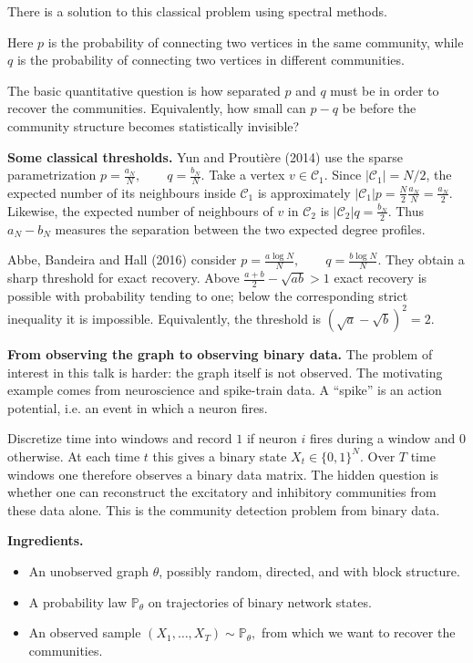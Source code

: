 There is a solution to this classical
problem using spectral methods.

Here $p$ is the probability of connecting
two vertices in the same community, while
$q$ is the probability of connecting two
vertices in different communities.

The basic quantitative question is how
separated $p$ and $q$ must be in order to
recover the communities. Equivalently, how
small can $p-q$ be before the community
structure becomes statistically invisible?

\medskip\noindent
{\bf Some classical thresholds.}
Yun and Prouti\`ere (2014) use the sparse
parametrization
$
p=\frac{a_N}{N},
\qquad
q=\frac{b_N}{N}.
$
Take a vertex $v\in\mathcal{C}_1$.
Since $|\mathcal{C}_1|=N/2$, the expected
number of its neighbours inside
$\mathcal{C}_1$ is approximately
$
|\mathcal{C}_1|p
=\frac{N}{2}\frac{a_N}{N}
=\frac{a_N}{2}.
$
Likewise, the expected number of
neighbours of $v$ in $\mathcal{C}_2$ is
$
|\mathcal{C}_2|q=\frac{b_N}{2}.
$
Thus $a_N-b_N$ measures the separation
between the two expected degree profiles.

Abbe, Bandeira and Hall (2016) consider
$
p=\frac{a\log N}{N},
\qquad
q=\frac{b\log N}{N}.
$
They obtain a sharp threshold for exact
recovery. Above
$
\frac{a+b}{2}-\sqrt{ab}>1
$
exact recovery is possible with
probability tending to one; below the
corresponding strict inequality it is
impossible. Equivalently, the threshold is
$
(\sqrt a-\sqrt b)^2=2.
$

\medskip\noindent
{\bf From observing the graph to observing
binary data.}
The problem of interest in this talk is
harder: the graph itself is not observed.
The motivating example comes from
neuroscience and spike-train data. A
``spike'' is an action potential, i.e. an
event in which a neuron fires.

Discretize time into windows and record
$1$ if neuron $i$ fires during a window
and $0$ otherwise. At each time $t$ this
gives a binary state
$
X_t\in\{0,1\}^N.
$
Over $T$ time windows one therefore
observes a binary data matrix. The hidden
question is whether one can reconstruct
the excitatory and inhibitory communities
from these data alone. This is the
community detection problem from binary
data.

\medskip\noindent
{\bf Ingredients.}
\begin{itemize}
\item
An unobserved graph $\theta$, possibly
random, directed, and with block
structure.

\item
A probability law $\mathbb{P}_\theta$ on
trajectories of binary network states.

\item
An observed sample
$
(X_1,\ldots,X_T)\sim\mathbb{P}_\theta,
$
from which we want to recover the
communities.
\end{itemize}

